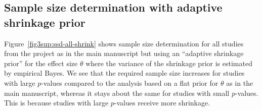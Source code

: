 \begin{subappendices}
\subsection{Sample size determination with adaptive shrinkage prior}
\label{sec3sup:ssdprotzko}
Figure~\ref{fig3sup:ssd-all-shrink} shows sample size determination for all
studies from the \citet{Protzko2020} project as in the main manuscript but using
an ``adaptive shrinkage prior'' for the effect size $\theta$ where the variance
of the shrinkage prior is estimated by empirical Bayes. We see that the required
sample size increases for studies with large $p$-values compared to the analysis
based on a flat prior for $\theta$ as in the main manuscript, whereas it stays
about the same for studies with small $p$-values. This is because studies with
large $p$-values receive more shrinkage.
\end{subappendices}

\newpage


